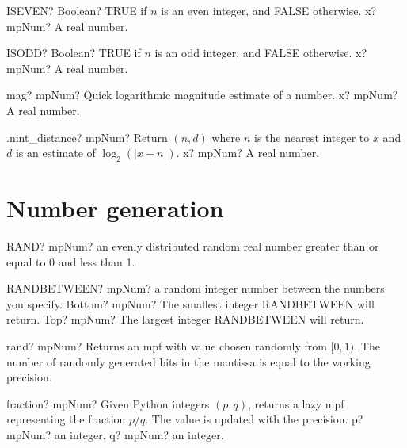 \documentclass[12pt,a4paper,openany]{book}
\begin{document}
\begin{mpFunctionsExtract}
\mpWorksheetFunctionOneNotImplemented
{ISEVEN? Boolean? TRUE if $n$ is an even integer, and FALSE otherwise.}
{x? mpNum? A real number.}
\end{mpFunctionsExtract}

\begin{mpFunctionsExtract}
\mpWorksheetFunctionOneNotImplemented
{ISODD? Boolean? TRUE if $n$ is an odd integer, and FALSE otherwise.}
{x? mpNum? A real number.}
\end{mpFunctionsExtract}

\begin{mpFunctionsExtract}
\mpFunctionOne
{mag? mpNum? Quick logarithmic magnitude estimate of a number.}
{x? mpNum? A real number.}
\end{mpFunctionsExtract}

\begin{mpFunctionsExtract}
\mpFunctionOne
{.nint\_distance? mpNum? Return $(n,d)$ where $n$ is the nearest integer to $x$ and $d$ is an estimate of $\log_2(|x-n|)$.}
{x? mpNum? A real number.}
\end{mpFunctionsExtract}

\section{Number generation}

\begin{mpFunctionsExtract}
\mpWorksheetFunctionZero
{RAND? mpNum? an evenly distributed random real number greater than or equal to 0 and less than 1.}
\end{mpFunctionsExtract}

\begin{mpFunctionsExtract}
\mpWorksheetFunctionTwoNotImplemented
{RANDBETWEEN? mpNum?  a random integer number between the numbers you specify.}
{Bottom? mpNum? The smallest integer RANDBETWEEN will return.}
{Top? mpNum? The largest integer RANDBETWEEN will return.}
\end{mpFunctionsExtract}

\begin{mpFunctionsExtract}
\mpFunctionZero
{rand? mpNum? Returns an mpf with value chosen randomly from $[0,1)$. The number of randomly generated bits in the mantissa is equal to the working precision.}
\end{mpFunctionsExtract}

\begin{mpFunctionsExtract}
\mpFunctionTwo
{fraction? mpNum?  Given Python integers $(p,q)$, returns a lazy mpf representing the fraction $p/q$. The value is updated with the precision.}
{p? mpNum? an integer.}
{q? mpNum? an integer.}
\end{mpFunctionsExtract}
\end{document}
